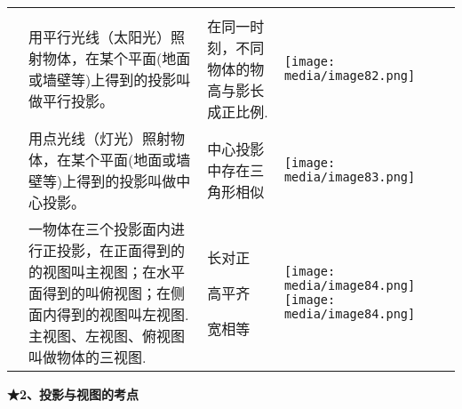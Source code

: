 \documentclass[a4paper,11pt,UTF8]{ctexart}
\begin{document}
\begin{longtable}[]{@{}llll@{}}
\toprule
\endhead
& & &\tabularnewline
&
用平行光线（太阳光）照射物体，在某个平面(地面或墙壁等)上得到的投影叫做平行投影。
& 在同一时刻，不同物体的物高与影长成正比例. &
\texttt{[image: media/image82.png]}\tabularnewline
&
用点光线（灯光）照射物体，在某个平面(地面或墙壁等)上得到的投影叫做中心投影。
& 中心投影中存在三角形相似 &
\texttt{[image: media/image83.png]}\tabularnewline
\begin{minipage}[t]{0.22\columnwidth}\raggedright
\strut
\end{minipage} & \begin{minipage}[t]{0.22\columnwidth}\raggedright
一物体在三个投影面内进行正投影，在正面得到的的视图叫主视图；在水平面得到的叫俯视图；在侧面内得到的视图叫左视图.主视图、左视图、俯视图叫做物体的三视图.\strut
\end{minipage} & \begin{minipage}[t]{0.22\columnwidth}\raggedright
长对正

高平齐

宽相等\strut
\end{minipage} & \begin{minipage}[t]{0.22\columnwidth}\raggedright
\texttt{[image: media/image84.png]}\texttt{[image: media/image84.png]}\strut
\end{minipage}\tabularnewline
\bottomrule
\end{longtable}

\textbf{★2、投影与视图的考点}
\end{document}

